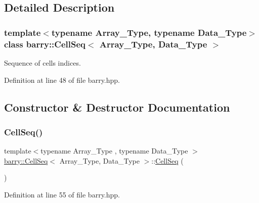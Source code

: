 \subsection{Detailed Description}
\subsubsection*{template$<$typename Array\+\_\+\+Type, typename Data\+\_\+\+Type$>$\newline
class barry\+::\+Cell\+Seq$<$ Array\+\_\+\+Type, Data\+\_\+\+Type $>$}

Sequence of cells indices. 



Definition at line 48 of file barry.\+hpp.



\subsection{Constructor \& Destructor Documentation}
\mbox{\label{classbarry_1_1_cell_seq_a7e9250af55622cdf1429d23e1052635c}} 
\subsubsection{\texorpdfstring{Cell\+Seq()}{CellSeq()}\hspace{0.1cm}{\footnotesize\ttfamily [1/2]}}
{\footnotesize\ttfamily template$<$typename Array\+\_\+\+Type , typename Data\+\_\+\+Type $>$ \\
\hyperlink{classbarry_1_1_cell_seq}{barry\+::\+Cell\+Seq}$<$ Array\+\_\+\+Type, Data\+\_\+\+Type $>$\+::\hyperlink{classbarry_1_1_cell_seq}{Cell\+Seq} (\begin{DoxyParamCaption}{ }\end{DoxyParamCaption})\hspace{0.3cm}{\ttfamily [inline]}}



Definition at line 55 of file barry.\+hpp.

\mbox{\label{classbarry_1_1_cell_seq_af7ea37359c8cd87e45394482b7e27b41}} 
